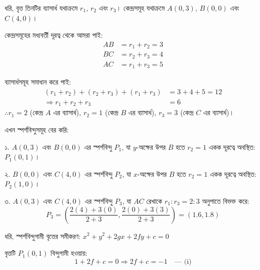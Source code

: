 \documentclass[12pt, a4paper]{article}
\begin{document}
\begin{tcolorbox}[solutionbox={সমাধান (Solution)}]
    \noindent
    ধরি, বৃত্ত তিনটির ব্যাসার্ধ যথাক্রমে $r_1$, $r_2$ এবং $r_3$। কেন্দ্রসমূহ যথাক্রমে $A(0, 3)$, $B(0, 0)$ এবং $C(4, 0)$।
    
    \vspace{0.5em}
    কেন্দ্রসমূহের মধ্যবর্তী দূরত্ব থেকে আমরা পাই:
    \begin{align*}
        AB &= r_1 + r_2 = 3 \\
        BC &= r_2 + r_3 = 4 \\
        AC &= r_1 + r_3 = 5 
    \end{align*}
    
    \vspace{0.5em}
    ব্যাসার্ধসমূহ সমাধান করে পাই:
    \begin{align*}
        (r_1 + r_2) + (r_2 + r_3) + (r_1 + r_3) &= 3 + 4 + 5 = 12 \\
        \Rightarrow r_1 + r_2 + r_3 &= 6
    \end{align*}
    $\therefore r_1 = 2$ (কেন্দ্র $A$ এর ব্যাসার্ধ), $r_2 = 1$ (কেন্দ্র $B$ এর ব্যাসার্ধ), $r_3 = 3$ (কেন্দ্র $C$ এর ব্যাসার্ধ)।
    
    \vspace{0.5em}
    এখন স্পর্শবিন্দুসমূহ বের করি:
    
    \vspace{0.5em}
    ১. $A(0, 3)$ এবং $B(0, 0)$ এর স্পর্শবিন্দু $P_1$, যা $y$-অক্ষের উপর $B$ হতে $r_2 = 1$ একক দূরত্বে অবস্থিত: $P_1(0, 1)$।
    
    \vspace{0.5em}
    ২. $B(0, 0)$ এবং $C(4, 0)$ এর স্পর্শবিন্দু $P_2$, যা $x$-অক্ষের উপর $B$ হতে $r_2 = 1$ একক দূরত্বে অবস্থিত: $P_2(1, 0)$।
    
    \vspace{0.5em}
    ৩. $A(0, 3)$ এবং $C(4, 0)$ এর স্পর্শবিন্দু $P_3$, যা $AC$ রেখাকে $r_1 : r_3 = 2 : 3$ অনুপাতে বিভক্ত করে:
    \[ P_3 = \left(\frac{2(4) + 3(0)}{2+3}, \frac{2(0) + 3(3)}{2+3}\right) = \left(1.6, 1.8\right) \]
    
    \vspace{0.5em}
    ধরি, স্পর্শবিন্দুগামী বৃত্তের সমীকরণ: $x^2 + y^2 + 2gx + 2fy + c = 0$
    
    \vspace{0.5em}
    বৃত্তটি $P_1(0, 1)$ বিন্দুগামী হওয়ায়:
    \[ 1 + 2f + c = 0 \Rightarrow 2f + c = -1 \quad \text{--- (i)} \]
    

\end{tcolorbox}
\end{document}
